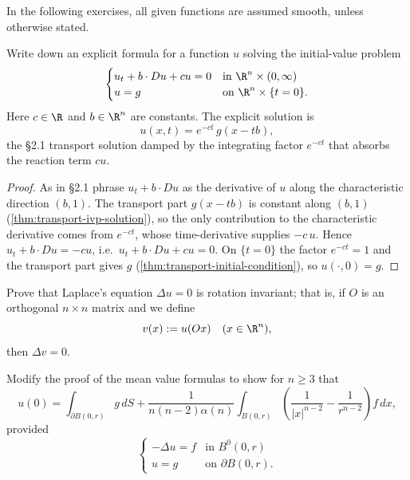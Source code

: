 In the following exercises, all given functions are assumed smooth, unless otherwise stated.

\begin{theorem}
\label{ex:transport-reaction-equation}
\leanok
Write down an explicit formula for a function $u$ solving the initial-value problem
$$\begin{cases}
u_t + b \cdot Du + cu = 0 & \text{in } \R^n \times (0,\infty) \\
u = g & \text{on } \R^n \times \{t = 0\}.
\end{cases}$$
Here $c \in \R$ and $b \in \R^n$ are constants. The explicit solution is
$$u(x,t) = e^{-ct}\,g(x - tb),$$
the §2.1 transport solution damped by the integrating factor $e^{-ct}$ that absorbs
the reaction term $cu$.
\end{theorem}
\begin{proof}
\leanok
As in §2.1 phrase $u_t + b\cdot Du$ as the derivative of $u$ along the
characteristic direction $(b,1)$. The transport part $g(x-tb)$ is constant along
$(b,1)$ (\cref{thm:transport-ivp-solution}), so the only contribution to the
characteristic derivative comes from $e^{-ct}$, whose time-derivative supplies
$-c\,u$. Hence $u_t + b\cdot Du = -c u$, i.e.\ $u_t + b\cdot Du + cu = 0$. On
$\{t=0\}$ the factor $e^{-ct}=1$ and the transport part gives $g$
(\cref{thm:transport-initial-condition}), so $u(\cdot,0)=g$.
\end{proof}

\begin{exercise}
Prove that Laplace's equation $\Delta u = 0$ is rotation invariant; that is, if $O$ is an orthogonal $n \times n$ matrix and we define
$$v(x) := u(Ox) \quad (x \in \R^n),$$
then $\Delta v = 0$.
\end{exercise}

\begin{exercise}
Modify the proof of the mean value formulas to show for $n \geq 3$ that
$$u(0) = \int_{\partial B(0,r)} g \, dS + \frac{1}{n(n-2)\alpha(n)} \int_{B(0,r)} \left(\frac{1}{|x|^{n-2}} - \frac{1}{r^{n-2}}\right) f \, dx,$$
provided
$$\begin{cases}
-\Delta u = f & \text{in } B^0(0,r) \\
u = g & \text{on } \partial B(0,r).
\end{cases}$$
\end{exercise}

